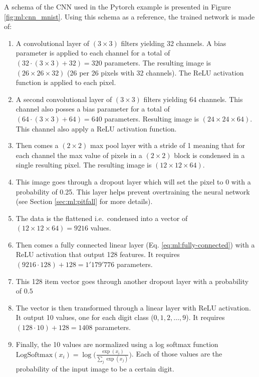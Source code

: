 \documentclass[../main.tex]{subfiles}
\begin{document}
A schema of the CNN used in the Pytorch example is presented in Figure \ref{fig:ml:cnn_mnist}. Using this schema as a reference, the trained network is made of:
\begin{enumerate}
  \item A convolutional layer of $(3 \times 3)$ filters yielding 32 channels. A bias parameter is applied to each channel for a total of $(32 \cdot (3\times3) + 32) = 320$ parameters. The resulting image is $(26\times26 \times 32)$ (26 per 26 pixels with 32 channels). The ReLU activation function is applied to each pixel.
  \item A second convolutional layer of $(3 \times 3)$ filters yielding 64 channels. This channel also posses a bias parameter for a total of $(64 \cdot (3\times3) + 64) = 640$ parameters. Resulting image is $(24\times24\times64)$. This channel also apply a ReLU activation function.
  \item Then comes a $(2\times2)$ max pool layer with a stride of 1 meaning that for each channel the max value of pixels in a $(2\times2)$ block is condensed in a single resulting pixel. The resulting image is $(12 \times 12 \times 64)$.
  \item This image goes through a dropout layer which will set the pixel to 0 with a probability of 0.25. This layer helps prevent overtraining the neural network (see Section \ref{sec:ml:pitfall} for more details).
  \item The data is the flattened i.e.\ condensed into a vector of $(12 \times 12 \times 64) = 9216$ values.
  \item Then comes a fully connected linear layer (Eq. \ref{eq:ml:fully-connected}) with a ReLU activation that output 128 features. It requires $(9216 \cdot 128)+ 128 = 1'179'776$ parameters.
  \item This 128 item vector goes through another dropout layer with a probability of $0.5$
  \item The vector is then transformed through a linear layer with ReLU activation. It output 10 values, one for each digit class ($0, 1, 2, \dots, 9$). It requires $(128 \cdot 10) + 128 = 1408$ parameters.
  \item Finally, the 10 values are normalized using a log softmax function $\mathrm{LogSoftmax}(x_i) = \log \bigg(\frac{\exp(x_i)}{\sum_j \exp(x_j)}\bigg)$. Each of those values are the probability of the input image to be a certain digit.
\end{enumerate}
\end{document}
